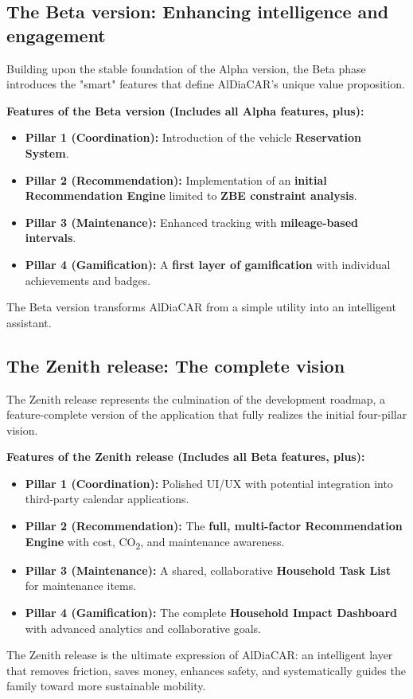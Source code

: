 \subsection{The Beta version: Enhancing intelligence and engagement}
Building upon the stable foundation of the Alpha version, the Beta phase introduces the "smart" features that define AlDiaCAR's unique value proposition.
\textgap

\textbf{Features of the Beta version (Includes all Alpha features, plus):}
\begin{itemize}
\item \textbf{Pillar 1 (Coordination):} Introduction of the vehicle \textbf{Reservation System}.
\item \textbf{Pillar 2 (Recommendation):} Implementation of an \textbf{initial Recommendation Engine} limited to \textbf{ZBE constraint analysis}.
\item \textbf{Pillar 3 (Maintenance):} Enhanced tracking with \textbf{mileage-based intervals}.
\item \textbf{Pillar 4 (Gamification):} A \textbf{first layer of gamification} with individual achievements and badges.
\end{itemize}
The Beta version transforms AlDiaCAR from a simple utility into an intelligent assistant.

\subsection{The Zenith release: The complete vision}
The Zenith release represents the culmination of the development roadmap, a feature-complete version of the application that fully realizes the initial four-pillar vision.
\textgap

\textbf{Features of the Zenith release (Includes all Beta features, plus):}
\begin{itemize}
\item \textbf{Pillar 1 (Coordination):} Polished UI/UX with potential integration into third-party calendar applications.
\item \textbf{Pillar 2 (Recommendation):} The \textbf{full, multi-factor Recommendation Engine} with cost, CO\textsubscript{2}, and maintenance awareness.
\item \textbf{Pillar 3 (Maintenance):} A shared, collaborative \textbf{Household Task List} for maintenance items.
\item \textbf{Pillar 4 (Gamification):} The complete \textbf{Household Impact Dashboard} with advanced analytics and collaborative goals.
\end{itemize}
The Zenith release is the ultimate expression of AlDiaCAR: an intelligent layer that removes friction, saves money, enhances safety, and systematically guides the family toward more sustainable mobility.
